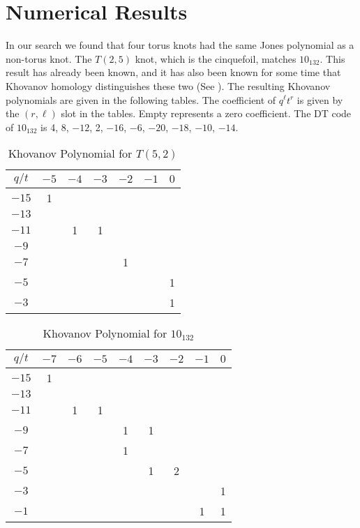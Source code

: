 \documentclass{article}
\theoremstyle{plain}
\begin{document}
    \section{Numerical Results}
        In our search we found that four torus knots had the same Jones
        polynomial as a non-torus knot. The $T(2,5)$ knot, which is the
        cinquefoil, matches $10_{132}$. This result has already been known,
        and it has also been known for some time that Khovanov homology
        distinguishes these two (See \cite{KatlasKhoHo}). The resulting
        Khovanov polynomials are given in the following tables. The coefficient
        of $q^{\ell}t^{r}$ is given by the $(r,\ell)$ slot in the tables. Empty
        represents a zero coefficient. The DT code of $10_{132}$ is
        4, 8, $-12$, 2, $-16$, $-6$, $-20$, $-18$, $-10$, $-14$.
        \begin{table}[H]
            \centering
            \begin{tabular}{| c | c | c | c | c | c | c |}
                \hline
                $q/t$&$-5$&$-4$&$-3$&$-2$&$-1$&$0$\\
                \hline
                $-15$&1&&&&&\\
                \hline
                $-13$&&&&&&\\
                \hline
                $-11$&&1&1&&&\\
                \hline
                $-9$&&&&&&\\
                \hline
                $-7$&&&&1&&\\
                \hline
                $-5$&&&&&&1\\
                \hline
                $-3$&&&&&&1\\
                \hline
            \end{tabular}
            \caption{Khovanov Polynomial for $T(5,2)$}
        \end{table}
        \begin{table}[H]
            \centering
            \begin{tabular}{| c | c | c | c | c | c | c | c | c |}
                \hline
                $q/t$&$-7$&$-6$&$-5$&$-4$&$-3$&$-2$&$-1$&$0$\\
                \hline
                $-15$&1&&&&&&&\\
                \hline
                $-13$&&&&&&&&\\
                \hline
                $-11$&&1&1&&&&&\\
                \hline
                $-9$&&&&1&1&&&\\
                \hline
                $-7$&&&&1&&&&\\
                \hline
                $-5$&&&&&1&2&&\\
                \hline
                $-3$&&&&&&&&1\\
                \hline
                $-1$&&&&&&&1&1\\
                \hline
            \end{tabular}
            \caption{Khovanov Polynomial for $10_{132}$}
        \end{table}
\end{document}
